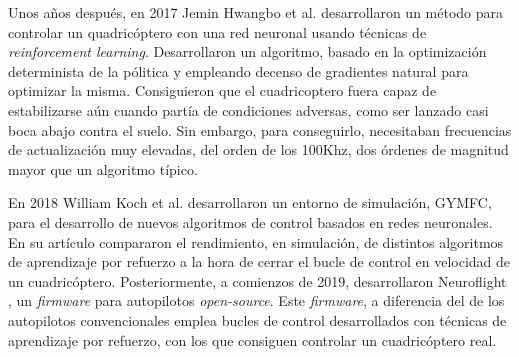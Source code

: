Unos años después, en 2017 Jemin Hwangbo et al. \cite{hwangbo2017control} desarrollaron un método para controlar un quadricóptero con una red neuronal usando técnicas de \textit{reinforcement learning}. Desarrollaron un algoritmo, basado en la optimización determinista de la pólitica y empleando decenso de gradientes natural para optimizar la misma. Consiguieron que el cuadricoptero fuera capaz de estabilizarse aún cuando partía de condiciones adversas, como ser lanzado casi boca abajo contra el suelo. Sin embargo, para conseguirlo, necesitaban frecuencias de actualización muy elevadas, del orden de los 100Khz, dos órdenes de magnitud mayor que un algoritmo típico.

 En 2018 William Koch et al. \cite{koch2019reinforcement} desarrollaron un entorno de simulación, GYMFC, para el desarrollo de nuevos algoritmos de control basados en redes neuronales. En su artículo compararon el rendimiento, en simulación, de distintos algoritmos de aprendizaje por refuerzo a la hora de cerrar el bucle de control en velocidad de un cuadricóptero. Posteriormente, a comienzos de 2019, desarrollaron Neuroflight , un \textit{firmware} para autopilotos \textit{open-source}. Este \textit{firmware}, a diferencia del de los autopilotos convencionales emplea bucles de control desarrollados con técnicas de aprendizaje por refuerzo, con los que consiguen controlar un cuadricóptero real. 

 